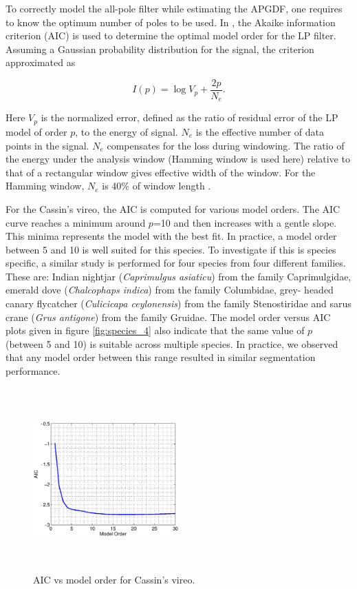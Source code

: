 \documentclass[a4paper]{article}
\begin{document}
To correctly model the all-pole filter while estimating the APGDF, one requires
to know the optimum number of poles to be used. In \cite{makhoul}, the Akaike
information criterion (AIC) is used to determine the optimal model order for the
LP filter. Assuming a Gaussian probability distribution for the signal, the
criterion approximated as

\begin{equation}
I(p)=\log V_p+\frac{2p}{N_e}. 
\end{equation}

Here $V_p$ is the normalized error, defined as the ratio of residual error of the
LP model of order $p$, to the energy of signal. $N_e$ is the effective number of data points
in the signal.  $N_e$ compensates for the loss during windowing. The ratio of
the energy under the analysis window (Hamming window is used here) relative to
that of a rectangular window gives effective width of the window. For the
Hamming window, $N_e$ is 40\% of window length \cite{makhoul}.

For the Cassin's vireo, the AIC is computed for various model orders. The AIC
curve reaches a minimum around $p$=10 and then increases with a gentle slope.
This minima represents the model with the best fit. In
practice, a model order between 5 and 10 is well suited for this species.  To
investigate if this is species specific, a similar study is performed for four
species from four different families. These are: Indian nightjar
(\textit{Caprimulgus asiaticu}) from the family Caprimulgidae, emerald dove
(\textit{Chalcophaps indica}) from the family Columbidae, grey- headed canary
flycatcher (\textit{Culicicapa ceylonensis}) from the family Stenostiridae and
sarus crane (\textit{Grus antigone}) from the family Gruidae.  The model order
versus AIC plots given in figure \ref{fig:species_4} also indicate that the same
value of $p$ (between 5 and 10) is suitable across multiple species. In
practice, we observed that any model order between this range resulted in
similar segmentation performance.

 \begin{figure}[!ht]
	\centering
	\includegraphics[width=0.5\textwidth,height=7cm] {cassins_AIC.eps}
	\caption{AIC vs model order for Cassin's vireo.}   
	\label{fig:AIC_cassins}
\end{figure} 
\end{document}
